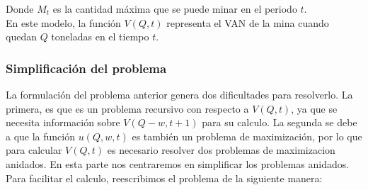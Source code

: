 \documentclass[12pt,letterpaper]{article}
\newcommand\mB{\mathcal{B}}
\newcommand\mD{\mathcal{D}}
\newcommand\mM{\mathcal{M}}
\newcommand\mS{\mathcal{S}}
\begin{document}
Donde $M_t$ es la cantidad máxima que se puede minar en el periodo $t$.\\
En este modelo, la función $V(Q,t)$ representa el VAN de la mina cuando quedan $Q$ toneladas en el tiempo $t$.

\subsubsection{Simplificación del problema}
La formulación del problema anterior genera dos dificultades para resolverlo. La primera, es que es un problema recursivo con respecto a $V(Q,t)$, ya que se necesita información sobre $V(Q-w,t+1)$ para su calculo. La segunda se debe a que la función $u(Q,w,t)$ es también un problema de maximización, por lo que para calcular $V(Q,t)$ es necesario resolver dos problemas de maximizacion anidados.
En esta parte nos centraremos en simplificar los problemas anidados. Para facilitar el calculo, reescribimos el problema de la siguiente manera:
\\
\end{document}
